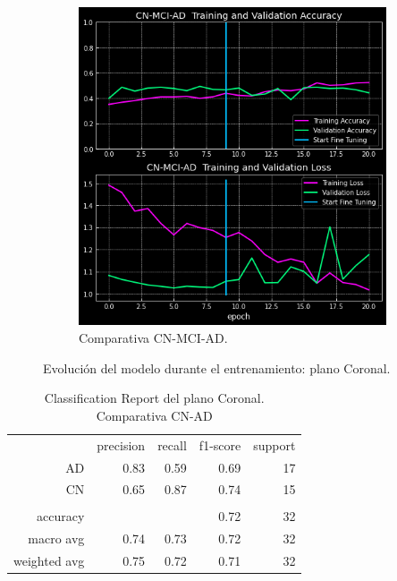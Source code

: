\begin{figure}[H]
\begin{subfigure}{0.4\textwidth}
        \includegraphics[width=\textwidth]{./imgs/resultados/coronal/CN_MCI_AD_output_CORONAL}
        \caption{Comparativa CN-MCI-AD. }
        \label{fig:coronal-c-mci-ad}
    \end{subfigure}
    \caption{Evolución del modelo durante el entrenamiento: plano Coronal.} \label{fig:coronal-model}
\end{figure}

\begin{table}[H]
    \centering
    \begin{tabular}{r r r r r}
        & precision & recall & f1-score & support \\
        AD & 0.83 & 0.59 & 0.69 & 17 \\
        CN & 0.65 & 0.87 & 0.74 & 15 \\
        & & & & \\
        accuracy &  &  & 0.72 & 32 \\
        macro avg & 0.74 & 0.73 & 0.72 & 32 \\
        weighted avg & 0.75 & 0.72 & 0.71 & 32 \\
    \end{tabular}
    \caption{Classification Report del plano Coronal. Comparativa CN-AD}
    \label{tab:cr-coronal-cn-ad}
\end{table}

